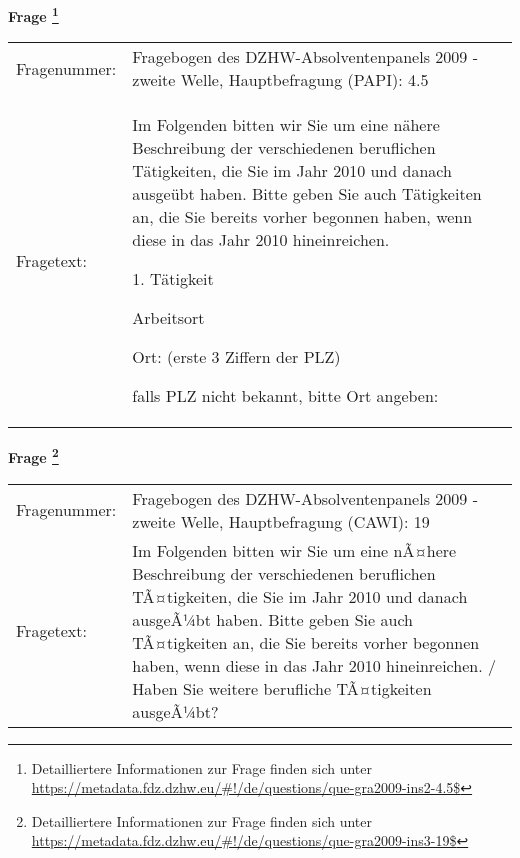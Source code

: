 				\vspace*{0.5cm}
                \noindent\textbf{Frage
	                \footnote{Detailliertere Informationen zur Frage finden sich unter
		              \url{https://metadata.fdz.dzhw.eu/\#!/de/questions/que-gra2009-ins2-4.5$}}}\\
				\begin{tabularx}{\hsize}{@{}lX}
					Fragenummer: &
					  Fragebogen des DZHW-Absolventenpanels 2009 - zweite Welle, Hauptbefragung (PAPI):
					  4.5
 \\
					Fragetext: & Im Folgenden bitten wir Sie um eine nähere Beschreibung der verschiedenen beruflichen Tätigkeiten, die Sie im Jahr 2010 und danach ausgeübt haben. Bitte geben Sie auch Tätigkeiten an, die Sie bereits vorher begonnen haben, wenn diese in das Jahr 2010 hineinreichen.\par  1. Tätigkeit\par  Arbeitsort\par  Ort: (erste 3 Ziffern der PLZ)\par  falls PLZ nicht bekannt, bitte Ort angeben: \\
				\end{tabularx}
				\vspace*{0.5cm}
                \noindent\textbf{Frage
	                \footnote{Detailliertere Informationen zur Frage finden sich unter
		              \url{https://metadata.fdz.dzhw.eu/\#!/de/questions/que-gra2009-ins3-19$}}}\\
				\begin{tabularx}{\hsize}{@{}lX}
					Fragenummer: &
					  Fragebogen des DZHW-Absolventenpanels 2009 - zweite Welle, Hauptbefragung (CAWI):
					  19
 \\
					Fragetext: & Im Folgenden bitten wir Sie um eine nÃ¤here Beschreibung der verschiedenen beruflichen TÃ¤tigkeiten, die Sie im Jahr 2010 und danach ausgeÃ¼bt haben. Bitte geben Sie auch TÃ¤tigkeiten an, die Sie bereits vorher begonnen haben, wenn diese in das Jahr 2010 hineinreichen. / Haben Sie weitere berufliche TÃ¤tigkeiten ausgeÃ¼bt? \\
				\end{tabularx}





